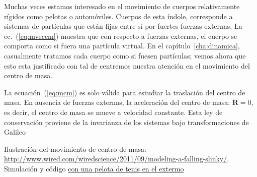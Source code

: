 Muchas veces estamos interesado en el movimiento de cuerpos relativamente rígidos como pelotas o automóviles. Cuerpos de esta índole, corresponde a sistemas de partículas que están fijas entre sí por fuertes fuerzas externas. La ec.~(\ref{eq:mveccm}) muestra que con respecto a fuerzas externas, el cuerpo se comporta como si fuera una partícula virtual. En el capítulo~\ref{cha:dinamica}, casualmente tratamos cada cuerpo como si fuesen partículas; vemos ahora que esto esta justificado con tal de centremos nuestra atención en el movimiento del centro de masa. 

La ecuación~(\ref{eq:mcm}) es solo válida para estudiar la traslación del centro de masa. En ausencia de fuerzas externas, la aceleración del centro de masa: $\ddot{\mathbf{R}}=0$, es decir, el centro de masa se mueve a velocidad constante. Esta ley de conservación proviene de la invarianza de los sistemas bajo transformaciones de Galileo

Ilustración del movimiento de centro de masa: \url{http://www.wired.com/wiredscience/2011/09/modeling-a-falling-slinky/}. Simulación y código  \href{http://www.wired.com/wiredscience/2011/10/more-slinky-physics/}{con una pelota de tenis en el extermo}

